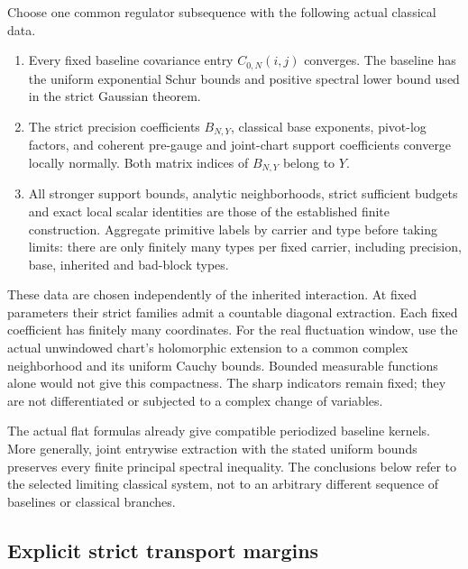 Choose one common regulator subsequence with the following
actual classical data.

\begin{enumerate}
\item Every fixed baseline covariance entry \(C_{0,N}(i,j)\)
converges. The baseline has the uniform exponential Schur
bounds and positive spectral lower bound used in the strict
Gaussian theorem.
\item The strict precision coefficients \(B_{N,Y}\), classical
base exponents, pivot-log factors, and coherent pre-gauge
and joint-chart support coefficients converge locally normally.
Both matrix indices of \(B_{N,Y}\) belong to \(Y\).
\item All stronger support bounds, analytic neighborhoods,
strict sufficient budgets and exact local scalar identities
are those of the established finite construction. Aggregate
primitive labels by carrier and type before taking limits:
there are only finitely many types per fixed carrier, including
precision, base, inherited and bad-block types.
\end{enumerate}

These data are chosen independently of the inherited interaction.
At fixed parameters their strict families admit a countable
diagonal extraction. Each fixed coefficient has finitely many
coordinates. For the real fluctuation window, use the actual
unwindowed chart's holomorphic extension to a common complex
neighborhood and its uniform Cauchy bounds. Bounded measurable
functions alone would not give this compactness. The sharp
indicators remain fixed; they are not differentiated or subjected
to a complex change of variables.

The actual flat formulas already give compatible periodized
baseline kernels. More generally, joint entrywise extraction
with the stated uniform bounds preserves every finite
principal spectral inequality. The conclusions below refer to
the selected limiting classical system, not to an arbitrary
different sequence of baselines or classical branches.

\subsection{Explicit strict transport margins}
\label{qll-margins-section}

